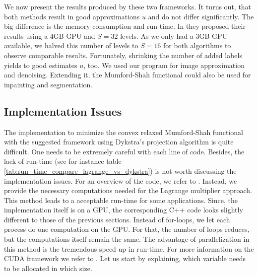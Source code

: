 \documentclass{scrreprt}
\begin{document}
        We now present the results produced by these two frameworks. It turns out, that both methods result in good approximations $u$ and do not differ significantly. The big difference is the memory consumption and run-time. In \cite{Pock-et-al-iccv09} they proposed their results using a 4GB GPU and $S = 32$ levels. As we only had a 3GB GPU available, we halved this number of levels to $S = 16$ for both algorithms to observe comparable results. Fortunately, shrinking the number of added labels yields to good estimates $u$, too. We used our program for image approximation and denoising. Extending it, the Mumford-Shah functional could also be used for inpainting and segmentation.

        \subsection{Implementation Issues} %
        \label{sub:implementation_issues_ms}
            
            The implementation to minimize the convex relaxed Mumford-Shah functional with the suggested framework using Dykstra's projection algorithm is quite difficult. One needs to be extremely careful with each line of code. Besides, the lack of run-time (see for instance table \ref{tab:run_time_compare_lagrange_vs_dykstra}) is not worth discussing the implementation issues. For an overview of the code, we refer to \cite{Bauer}. Instead, we provide the necessary computations needed for the Lagrange multiplier approach. This method leads to a acceptable run-time for some applications. Since, the implementation itself is on a GPU, the corresponding C++ code looks slightly different to those of the previous sections. Instead of for-loops, we let each process do one computation on the GPU. For that, the number of loops reduces, but the computations itself remain the same. The advantage of parallelization in this method is the tremendous speed up in run-time. For more information on the CUDA framework we refer to \cite{CUDA}. Let us start by explaining, which variable needs to be allocated in which size.
\end{document}
